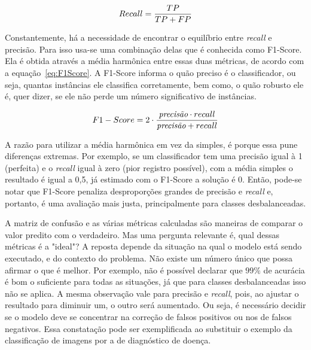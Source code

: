             \begin{equation}
                \centering
                Recall = \frac{TP}{TP + FP}
                \label{eq:precisão}
            \end{equation}
            
            Constantemente, há a necessidade de encontrar o equilíbrio entre \textit{recall} e precisão. Para isso usa-se uma combinação delas que é conhecida como F1-Score. Ela é obtida através a média harmônica entre essas duas métricas, de acordo com a equação~\ref{eq:F1Score}. A F1-Score informa o quão preciso é o classificador, ou seja, quantas instâncias ele classifica corretamente, bem como, o quão robusto ele é, quer dizer, se ele não perde um número significativo de instâncias.
            
            \begin{equation}
                \centering
                F1-Score = 2\cdot\frac{\textit{precisão} \cdot recall}{\textit{precisão} + recall}
                \label{eq:F1Score}
            \end{equation}
            
            A razão para utilizar a média harmônica em vez da simples, é porque essa pune diferenças extremas. Por exemplo, se um classificador tem uma precisão igual à 1 (perfeita) e o \textit{recall} igual à zero (pior registro possível), com a média simples o resultado é igual a 0,5, já estimado com o F1-Score a solução é 0. Então, pode-se notar que F1-Score penaliza desproporções grandes de precisão e \textit{recall} e, portanto, é uma avaliação mais justa, principalmente para classes desbalanceadas. 
            
            A matriz de confusão e as várias métricas calculadas são maneiras de comparar o valor predito com o verdadeiro. Mas uma pergunta relevante é, qual dessas métricas é a "ideal"? A reposta depende da situação na qual o modelo está sendo executado, e do contexto do problema. Não existe um número único que possa afirmar o que é melhor. Por exemplo, não é possível declarar que $99\%$ de acurácia é bom o suficiente para todas as situações, já que para classes desbalanceadas isso não se aplica. A mesma observação vale para precisão e \textit{recall}, pois, ao ajustar o resultado para diminuir um, o outro será aumentado. Ou seja, é necessário decidir se o modelo deve se concentrar na correção de falsos positivos ou nos de falsos negativos. Essa constatação pode ser exemplificada ao substituir o exemplo da classificação de imagens por a de diagnóstico de doença. 
            
